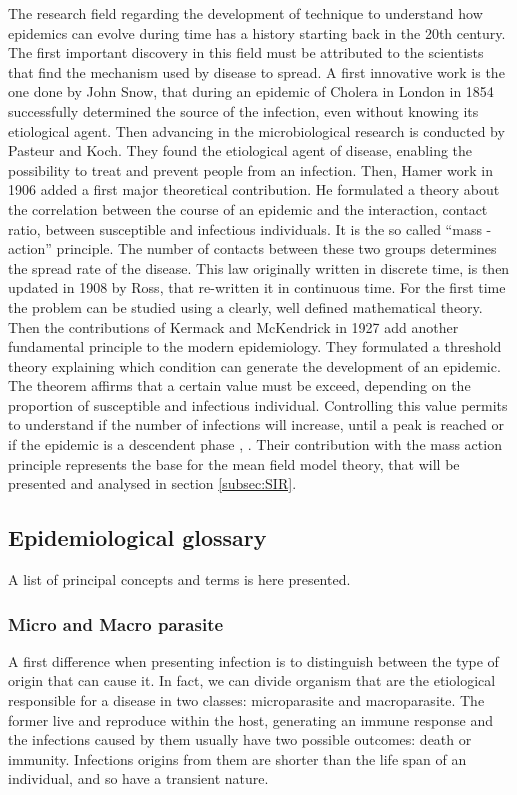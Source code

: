 The research field regarding the development of technique to understand how epidemics can evolve during time has a history starting back in the 20th century. The first important discovery in this field must be attributed to the scientists that find the mechanism used by disease to spread. 
A first innovative work is the one done by John Snow, that during an epidemic of Cholera in London in 1854 successfully determined the source of the infection, even without knowing its etiological agent. Then advancing in the microbiological research is conducted by Pasteur and Koch. They found the etiological agent of disease, enabling the possibility to treat and prevent people from an infection. 
Then, Hamer work in 1906 added a first major theoretical contribution. He formulated a theory about the correlation between the course of an epidemic and the interaction, contact ratio, between susceptible and infectious individuals. It is the so called “mass -action” principle. The number of contacts between these two groups determines the spread rate of the disease. 
This law originally written in discrete time, is then updated in 1908 by Ross, that re-written it  in continuous time. For the first time the problem can be studied using a clearly, well defined mathematical theory. Then the contributions of Kermack and McKendrick in 1927 add another fundamental principle to the modern epidemiology. They formulated a threshold theory explaining which condition can generate the development of an epidemic. The theorem affirms that a certain value must be exceed, depending on the proportion of susceptible and infectious individual. Controlling this value permits to understand if the number of infections will increase, until a peak is reached or if the epidemic is a descendent phase \cite{Mata2021}, \cite{Anderson_82}. 
Their contribution with the mass action principle represents the base for the mean field model theory, that will be presented and analysed in section \ref{subsec:SIR}. 



\subsection{Epidemiological glossary}
A list of principal concepts and terms is here presented.

\subsubsection{Micro and Macro parasite}
	A first difference when presenting infection is to distinguish between the type of origin that can cause it. In fact, we can divide organism that are the etiological responsible for a disease in two classes: microparasite and macroparasite. The former live and reproduce within the host, generating an immune response and the infections caused by them usually have two possible outcomes: death or immunity. Infections origins from them are shorter than the life span of an individual, and so have a transient nature.
